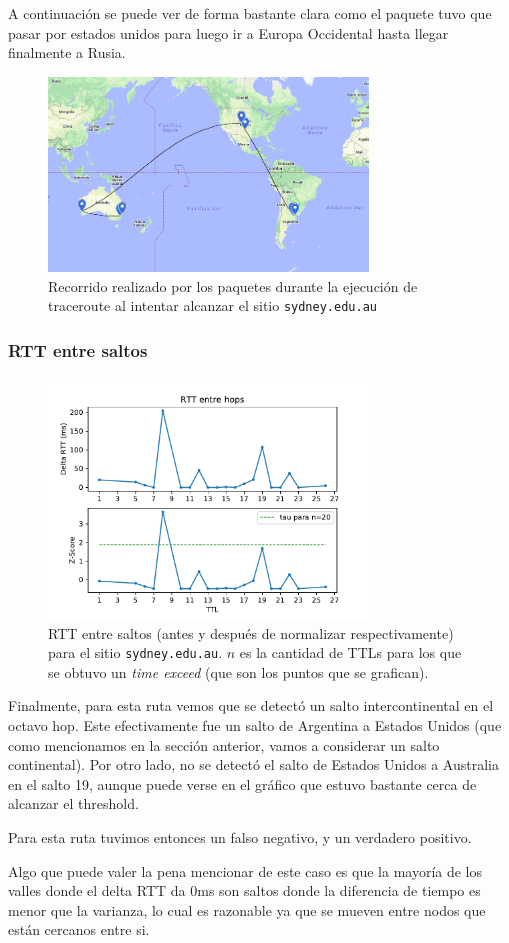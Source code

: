 A continuación se puede ver de forma bastante clara como el paquete tuvo que pasar por estados unidos para luego ir a Europa Occidental hasta llegar finalmente a Rusia.

\begin{figure}[H]
  \centering
  \includegraphics[width=8.5cm]{figs/sidney.png}
  \caption{\footnotesize Recorrido realizado por los paquetes durante la ejecución de traceroute al intentar alcanzar el sitio \texttt{sydney.edu.au}}
\end{figure}

\subsubsection*{RTT entre saltos}

\begin{figure}[H]
  \centering
  \includegraphics[width=8.5cm]{figs/traceroute-sidney.pdf}
  \caption{\footnotesize RTT entre saltos (antes y después de normalizar respectivamente) para el sitio \texttt{sydney.edu.au}. $n$ es la cantidad de TTLs para los que se obtuvo un \emph{time exceed} (que son los puntos que se grafican).}
\end{figure}

Finalmente, para esta ruta vemos que se detectó un salto intercontinental en el octavo hop. Este efectivamente fue un salto de Argentina a Estados Unidos (que como mencionamos en la sección anterior, vamos a considerar un salto continental). Por otro lado, no se detectó el salto de Estados Unidos a Australia en el salto 19, aunque puede verse en el gráfico que estuvo bastante cerca de alcanzar el threshold.

Para esta ruta tuvimos entonces un falso negativo, y un verdadero positivo.

Algo que puede valer la pena mencionar de este caso es que la mayoría de los valles donde el delta RTT da 0ms son saltos donde la diferencia de tiempo es menor que la varianza, lo cual es razonable ya que se mueven entre nodos que están cercanos entre si.
